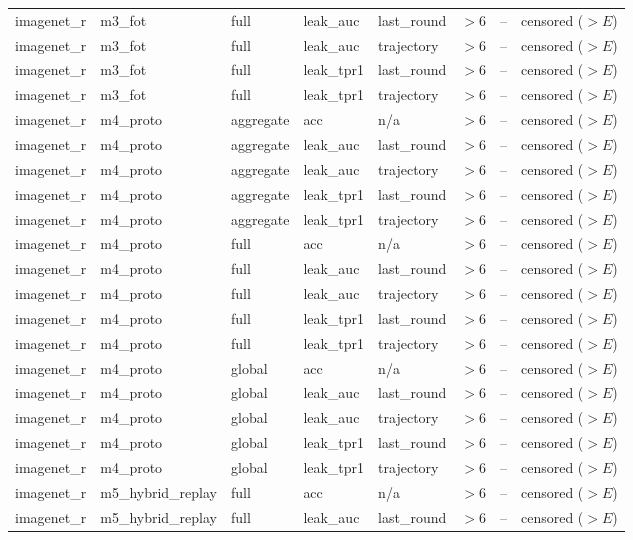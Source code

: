 \begin{tabular}{lllllrrl}
imagenet\_r & m3\_fot & full & leak\_auc & last\_round & $>$6 & -- & censored ($>E$) \\
imagenet\_r & m3\_fot & full & leak\_auc & trajectory & $>$6 & -- & censored ($>E$) \\
imagenet\_r & m3\_fot & full & leak\_tpr1 & last\_round & $>$6 & -- & censored ($>E$) \\
imagenet\_r & m3\_fot & full & leak\_tpr1 & trajectory & $>$6 & -- & censored ($>E$) \\
imagenet\_r & m4\_proto & aggregate & acc & n/a & $>$6 & -- & censored ($>E$) \\
imagenet\_r & m4\_proto & aggregate & leak\_auc & last\_round & $>$6 & -- & censored ($>E$) \\
imagenet\_r & m4\_proto & aggregate & leak\_auc & trajectory & $>$6 & -- & censored ($>E$) \\
imagenet\_r & m4\_proto & aggregate & leak\_tpr1 & last\_round & $>$6 & -- & censored ($>E$) \\
imagenet\_r & m4\_proto & aggregate & leak\_tpr1 & trajectory & $>$6 & -- & censored ($>E$) \\
imagenet\_r & m4\_proto & full & acc & n/a & $>$6 & -- & censored ($>E$) \\
imagenet\_r & m4\_proto & full & leak\_auc & last\_round & $>$6 & -- & censored ($>E$) \\
imagenet\_r & m4\_proto & full & leak\_auc & trajectory & $>$6 & -- & censored ($>E$) \\
imagenet\_r & m4\_proto & full & leak\_tpr1 & last\_round & $>$6 & -- & censored ($>E$) \\
imagenet\_r & m4\_proto & full & leak\_tpr1 & trajectory & $>$6 & -- & censored ($>E$) \\
imagenet\_r & m4\_proto & global & acc & n/a & $>$6 & -- & censored ($>E$) \\
imagenet\_r & m4\_proto & global & leak\_auc & last\_round & $>$6 & -- & censored ($>E$) \\
imagenet\_r & m4\_proto & global & leak\_auc & trajectory & $>$6 & -- & censored ($>E$) \\
imagenet\_r & m4\_proto & global & leak\_tpr1 & last\_round & $>$6 & -- & censored ($>E$) \\
imagenet\_r & m4\_proto & global & leak\_tpr1 & trajectory & $>$6 & -- & censored ($>E$) \\
imagenet\_r & m5\_hybrid\_replay & full & acc & n/a & $>$6 & -- & censored ($>E$) \\
imagenet\_r & m5\_hybrid\_replay & full & leak\_auc & last\_round & $>$6 & -- & censored ($>E$) \\

\end{tabular}
